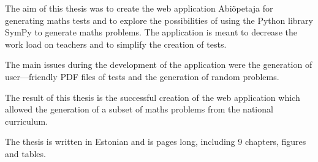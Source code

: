 The aim of this thesis was to create the web application Abiõpetaja for generating maths tests and to explore the possibilities of using the Python library SymPy to generate maths problems. The application is meant to decrease the work load on teachers and to simplify the creation of tests.

The main issues during the development of the application were the generation of user—friendly PDF files of tests and the generation of random problems.

The result of this thesis is the successful creation of the web application which allowed the generation of a subset of maths problems from the national curriculum.

The thesis is written in Estonian and is  pages long, including 9 chapters,  figures and  tables.

